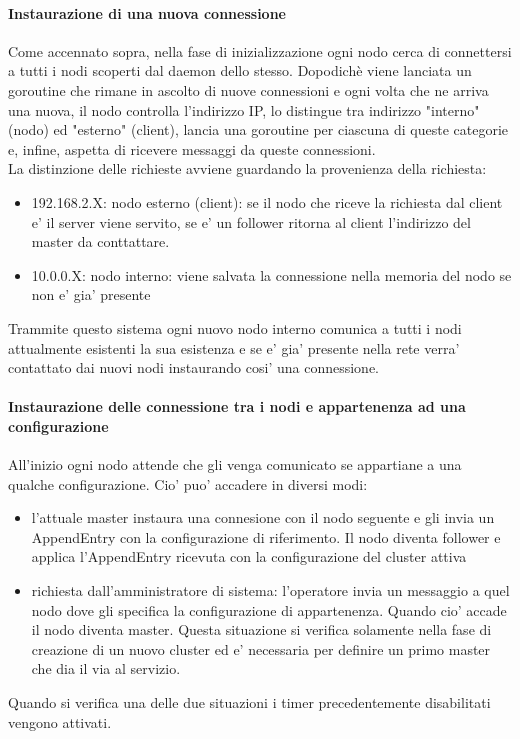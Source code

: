 \paragraph{Instaurazione di una nuova connessione}
Come accennato sopra, nella fase di inizializzazione ogni nodo cerca di connettersi a tutti i
nodi scoperti dal daemon dello stesso. 
Dopodichè viene lanciata un goroutine che rimane in ascolto di nuove connessioni e 
ogni volta che ne arriva una nuova, il nodo 
controlla l'indirizzo IP, lo distingue tra indirizzo "interno" (nodo) ed "esterno" (client),
lancia una goroutine per ciascuna di queste categorie e, infine, aspetta di ricevere messaggi 
da queste connessioni. \\
La distinzione delle richieste avviene guardando la provenienza della richiesta: 
\begin{itemize}
    \item 192.168.2.X: nodo esterno (client): se il nodo che riceve la richiesta dal client e' il
        server viene servito, se e' un follower ritorna al client l'indirizzo del master 
        da conttattare.
    \item 10.0.0.X: nodo interno: viene salvata la connessione nella memoria del nodo se non e'
        gia' presente
\end{itemize}
Trammite questo sistema ogni nuovo nodo interno comunica a tutti 
i nodi attualmente esistenti la sua esistenza e se e' gia' presente nella rete verra' contattato 
dai nuovi nodi instaurando cosi' una connessione.

\paragraph{Instaurazione delle connessione tra i nodi e appartenenza ad una configurazione}
All'inizio ogni nodo attende che gli venga comunicato se appartiane a una qualche configurazione.
Cio' puo' accadere in diversi modi:
\begin{itemize}
    \item l'attuale master instaura una connesione con il nodo seguente e gli invia un 
        AppendEntry con la configurazione di riferimento. 
        Il nodo diventa follower e applica l'AppendEntry ricevuta con la configurazione del 
        cluster attiva

    \item richiesta dall'amministratore di sistema: l'operatore invia un messaggio a quel nodo dove 
        gli specifica la configurazione di appartenenza. Quando cio' accade il nodo diventa master.
        Questa situazione si verifica solamente nella fase di creazione di un nuovo cluster 
        ed e' necessaria per definire un primo master che dia il via al servizio.
\end{itemize}
Quando si verifica una delle due situazioni i timer precedentemente disabilitati vengono attivati.

